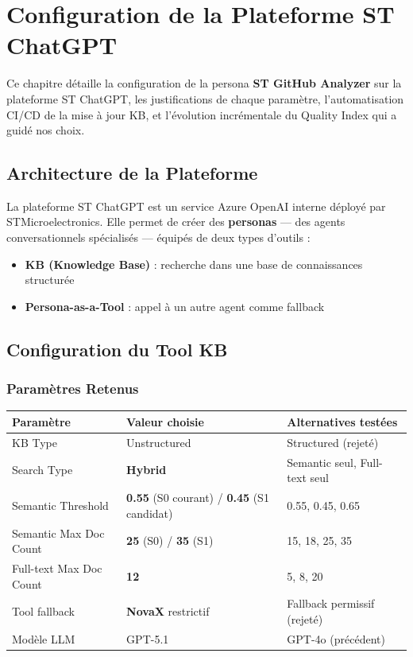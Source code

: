 
\chapter{Configuration de la Plateforme ST ChatGPT}
\label{chap:configuration}

Ce chapitre détaille la configuration de la persona \textbf{ST GitHub Analyzer} sur la plateforme ST ChatGPT, les justifications de chaque paramètre, l'automatisation CI/CD de la mise à jour KB, et l'évolution incrémentale du Quality Index qui a guidé nos choix.

\section{Architecture de la Plateforme}

La plateforme ST ChatGPT est un service Azure OpenAI interne déployé par STMicroelectronics. Elle permet de créer des \textbf{personas} --- des agents conversationnels spécialisés --- équipés de deux types d'outils :

\begin{itemize}
  \item \textbf{KB (Knowledge Base)} : recherche dans une base de connaissances structurée
  \item \textbf{Persona-as-a-Tool} : appel à un autre agent comme fallback
\end{itemize}

\section{Configuration du Tool KB}

\subsection{Paramètres Retenus}

\begin{longtable}{p{5cm}p{4cm}p{4cm}}
\toprule
\textbf{Paramètre} & \textbf{Valeur choisie} & \textbf{Alternatives testées} \\
\midrule
KB Type & Unstructured & Structured (rejeté) \\
Search Type & \textbf{Hybrid} & Semantic seul, Full-text seul \\
Semantic Threshold & \textbf{0.55} (S0 courant) / \textbf{0.45} (S1 candidat) & 0.55, 0.45, 0.65 \\
Semantic Max Doc Count & \textbf{25} (S0) / \textbf{35} (S1) & 15, 18, 25, 35 \\
Full-text Max Doc Count & \textbf{12} & 5, 8, 20 \\
Tool fallback & \textbf{NovaX} restrictif & Fallback permissif (rejeté) \\
Modèle LLM & GPT-5.1 & GPT-4o (précédent) \\
\bottomrule
\end{longtable}

